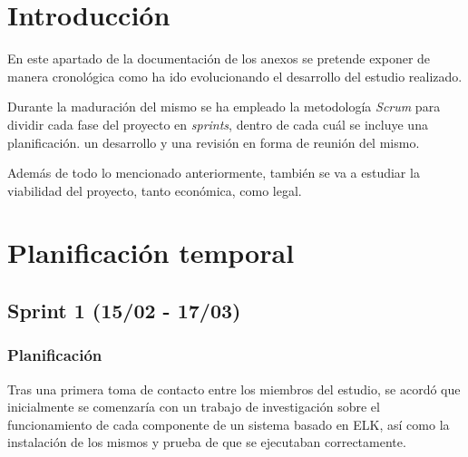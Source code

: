 
\section{Introducción}
En este apartado de la documentación de los anexos se pretende exponer de manera cronológica como ha ido evolucionando el desarrollo del estudio realizado.

Durante la maduración del mismo se ha empleado la metodología \textit{Scrum} para dividir cada fase del proyecto en \textit{sprints}, dentro de cada cuál se incluye una planificación. un desarrollo y una revisión en forma de reunión del mismo.

Además de todo lo mencionado anteriormente, también se va a estudiar la viabilidad del proyecto, tanto económica, como legal.

\paragraph{}
\paragraph{}
\paragraph{}
\paragraph{}
\paragraph{}


\section{Planificación temporal}

\subsection{Sprint 1 (15/02 - 17/03)}
\subsubsection{Planificación}
Tras una primera toma de contacto entre los miembros del estudio, se acordó que inicialmente se comenzaría con un trabajo de investigación sobre el funcionamiento de cada componente de un sistema basado en ELK, así como la instalación de los mismos y prueba de que se ejecutaban correctamente.

